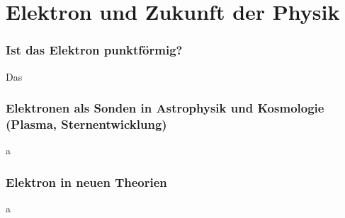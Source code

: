 \chapter{Elektron und Zukunft der Physik}



\subsection{Ist das Elektron punktförmig?}

Das

\subsection{Elektronen als Sonden in Astrophysik und Kosmologie (Plasma, Sternentwicklung)}
a
\subsection{Elektron in neuen Theorien}
a